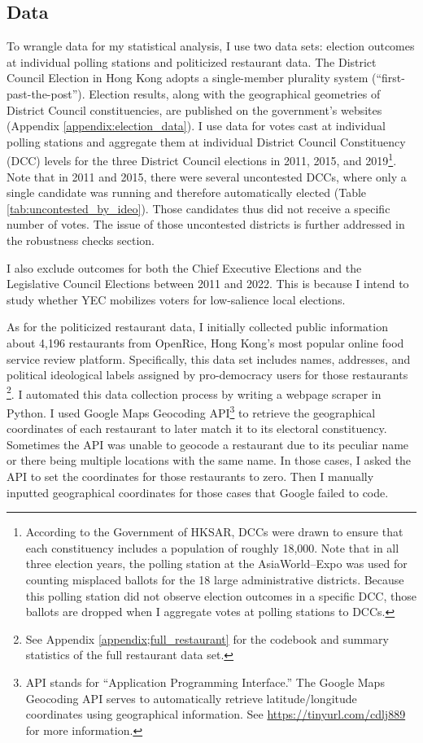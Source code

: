 \documentclass[letterpaper, 12pt]{article}
\begin{document}
\subsection{Data}
To wrangle data for my statistical analysis, I use two data sets: election outcomes at individual polling stations and politicized restaurant data. The District Council Election in Hong Kong adopts a single-member plurality system (``first-past-the-post''). Election results, along with the geographical geometries of District Council constituencies, are published on the government's websites (Appendix \ref{appendix:election_data}). I use data for votes cast at individual polling stations and aggregate them at individual District Council Constituency (DCC) levels for the three District Council elections in 2011, 2015, and 2019\footnote{According to the Government of HKSAR, DCCs were drawn to ensure that each constituency includes a population of roughly 18,000. Note that in all three election years, the polling station at the AsiaWorld–Expo was used for counting misplaced ballots for the 18 large administrative districts. Because this polling station did not observe election outcomes in a specific DCC, those ballots are dropped when I aggregate votes at polling stations to DCCs.}. Note that in 2011 and 2015, there were several uncontested DCCs, where only a single candidate was running and therefore automatically elected (Table \ref{tab:uncontested_by_ideo}). Those candidates thus did not receive a specific number of votes. The issue of those uncontested districts is further addressed in the robustness checks section. 

I also exclude outcomes for both the Chief Executive Elections and the Legislative Council Elections between 2011 and 2022. This is because I intend to study whether YEC mobilizes voters for low-salience local elections. 

As for the politicized restaurant data, I initially collected public information about 4,196 restaurants from OpenRice, Hong Kong's most popular online food service review platform. Specifically, this data set includes names, addresses, and political ideological labels assigned by pro-democracy users for those restaurants \footnote{See Appendix \ref{appendix;full_restaurant} for the codebook and summary statistics of the full restaurant data set.}. I automated this data collection process by writing a webpage scraper in Python. I used Google Maps Geocoding API\footnote{API stands for ``Application Programming Interface.'' The Google Maps Geocoding API serves to automatically retrieve latitude/longitude coordinates using geographical information. See \url{https://tinyurl.com/cdlj889} for more information.} to retrieve the geographical coordinates of each restaurant to later match it to its electoral constituency. Sometimes the API was unable to geocode a restaurant due to its peculiar name or there being multiple locations with the same name. In those cases, I asked the API to set the coordinates for those restaurants to zero. Then I manually inputted geographical coordinates for those cases that Google failed to code. 
\end{document}
